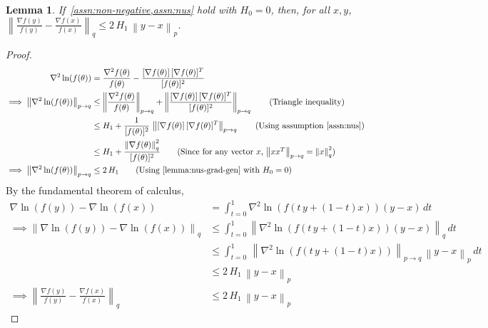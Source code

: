 \documentclass{article}
\newtheorem{lemma}{Lemma}
\newcommand{\normsq}[1]{\left\|#1 \right\|^{2}}
\newcommand{\norm}[1]{\left\|#1 \right\|}
\begin{document}
\begin{lemma}
If~\cref{assn:non-negative,assn:nus} hold with $H_0 = 0$, then, for all $x, y$, $\norm{\frac{\nabla f(y)}{f(y)} - \frac{\nabla f(x)}{f(x)}}_q \leq 2 \, H_1 \, \norm{y - x}_p$.     
\label{lemma:log-smoothness}
\end{lemma}
\begin{proof}
\begin{align*}
\nabla^2 \ln(f(\theta)) &= \frac{\nabla^2 f(\theta)}{f(\theta)} - \frac{[\nabla f(\theta)] \, [\nabla f(\theta)]^{T}}{[f(\theta)]^2} \\
\implies \norm{\nabla^2 \ln(f(\theta))}_{p \to q} & \leq \norm{\frac{\nabla^2 f(\theta)}{f(\theta)}}_{p \to q} + \norm{\frac{[\nabla f(\theta)] \, [\nabla f(\theta)]^{T}}{[f(\theta)]^2}}_{p \to q} \tag{Triangle inequality} \\
& \leq H_1 + \frac{1}{[f(\theta)]^2} \, \norm{[\nabla f(\theta)] \, [\nabla f(\theta)]^{T}}_{p \to q} \tag{Using assumption \ref{assn:nus}} \\
& \leq H_1 + \frac{\normsq{\nabla f(\theta)}_q}{[f(\theta)]^2} \tag{Since for any vector $x$, $\norm{x x^T}_{p \to q} = \normsq{x}_{q}$} \\
\implies \norm{\nabla^2 \ln(f(\theta))}_{p \to q}  & \leq 2 \,  H_1 \tag{Using~\cref{lemma:nus-grad-gen} with $H_0 = 0$}
\end{align*}    
By the fundamental theorem of calculus, 
\begin{align*}
\nabla \ln(f(y)) - \nabla \ln(f(x)) & = \int_{t = 0}^{1} \nabla^2 \ln(f(t \, y + (1-t) x)) (y-x) \, dt \\
\implies \norm{\nabla \ln(f(y)) - \nabla \ln(f(x))}_{q} & \leq \int_{t = 0}^{1} \norm{\nabla^2 \ln(f(t \, y + (1-t) x)) (y-x)}_{q} \, dt \tag{Triangle inequality} \\
& \leq \int_{t = 0}^{1} \, \norm{\nabla^2 \ln(f(t \, y + (1-t) x)) }_{p \to q} \, \norm{y-x}_p \, dt \tag{By definition of matrix norm} \\
& \leq 2 \, H_1  \, \norm{y - x}_p \tag{Using the above relation} \\
\implies \norm{\frac{\nabla f(y)}{f(y)} - \frac{\nabla f(x)}{f(x)}}_q & \leq 2 \, H_1 \, \norm{y - x}_p     
\end{align*}
\end{proof}
\end{document}
